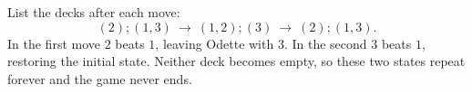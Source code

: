 List the decks after each move:\[(2);(1,3)\ \longrightarrow\ (1,2);(3)\ \longrightarrow\ (2);(1,3).\]In the first move $2$ beats $1$, leaving Odette with $3$. In the second $3$ beats $1$, restoring the initial state. Neither deck becomes empty, so these two states repeat forever and the game never ends.
